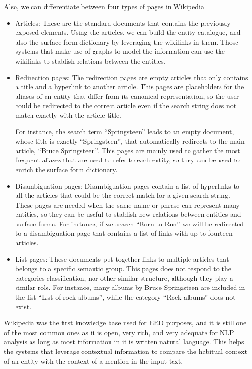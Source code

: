 Also, we can differentiate between four types of pages in Wikipedia:

\begin{itemize}
	
\item Articles: These are the standard documents that contains the previously exposed elements. Using the articles, we can build the entity catalogue, and also the surface form dictionary by leveraging the wikilinks in them. Those systems that make use of graphs to model the information can use the wikilinks to stablish relations between the entities.

\item Redirection pages: The redirection pages are empty articles that only contains a title and a hyperlink to another article. This pages are placeholders for the aliases of an entity that differ from its canonical representation, so the user could be redirected to the correct article even if the search string does not match exactly with the article title. 

For instance, the search term ``Springsteen'' leads to an empty document, whose title is exactly ``Springsteen'', that automatically redirects to the main article, ``Bruce Springsteen''. This pages are mainly used to gather the most frequent aliases that are used to refer to each entity, so they can be used to enrich the surface form dictionary.

\item Disambiguation pages: Disambiguation pages contain a list of hyperlinks to all the articles that could be the correct match for a given search string. These pages are needed when the same name or phrase can represent many entities, so they can be useful to stablish new relations between entities and surface forms. For instance, if we search ``Born to Run'' we will be redirected to a disambiguation page that contains a list of links with up to fourteen articles.

\item List pages: These documents put together links to multiple articles that belongs to a specific semantic group. This pages does not respond to the categories classification, nor other similar structure, although they play a similar role. For instance, many albums by Bruce Springsteen are included in the list ``List of rock albums'', while the category ``Rock albums'' does not exist.

\end{itemize}

Wikipedia was the first knowledge base used for ERD purposes, and it is still one of the most common ones as it is open, very rich, and very adequate for NLP analysis as long as most information in it is written natural language. This helps the systems that leverage contextual information to compare the habitual context of an entity with the context of a mention in the input text.

